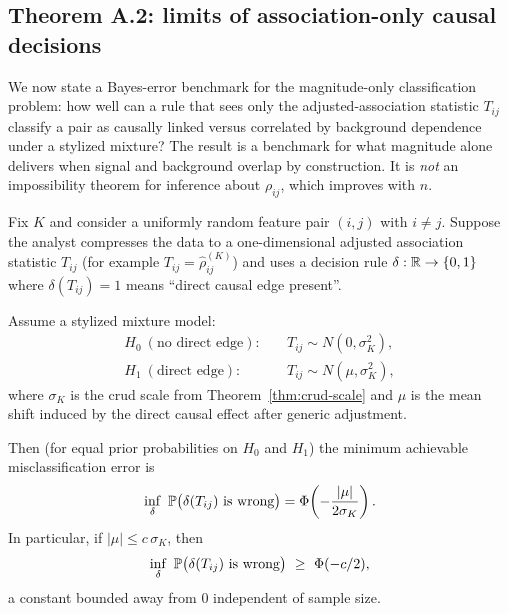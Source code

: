 \subsection{Theorem A.2: limits of association-only causal decisions}

We now state a Bayes-error benchmark for the magnitude-only classification problem: how well can a rule that sees only the adjusted-association statistic $T_{ij}$ classify a pair as causally linked versus correlated by background dependence under a stylized mixture? The result is a benchmark for what magnitude alone delivers when signal and background overlap by construction. It is \emph{not} an impossibility theorem for inference about $\rho_{ij}$, which improves with $n$.

\begin{theorem}\label{thm:assoc-only}
Fix $K$ and consider a uniformly random feature pair $(i,j)$ with $i\neq j$.
Suppose the analyst compresses the data to a one-dimensional adjusted association statistic
$T_{ij}$ (for example $T_{ij}=\hat\rho^{(K)}_{ij}$) and uses a decision rule
$\delta:\mathbb{R}\to\{0,1\}$ where $\delta(T_{ij})=1$ means ``direct causal edge present''.

Assume a stylized mixture model:
\begin{align}
H_0\ (\text{no direct edge}):\quad & T_{ij} \sim N(0,\sigma_K^2),\\
H_1\ (\text{direct edge}):\quad & T_{ij} \sim N(\mu,\sigma_K^2),
\end{align}
where $\sigma_K$ is the crud scale from Theorem~\ref{thm:crud-scale} and $\mu$ is the mean shift induced
by the direct causal effect after generic adjustment.

Then (for equal prior probabilities on $H_0$ and $H_1$) the minimum achievable misclassification error is
\begin{equation}
\inf_{\delta}\ \mathbb{P}\bigl(\delta(T_{ij})\ \text{is wrong}\bigr)
= \Phi\!\left(-\frac{|\mu|}{2\sigma_K}\right).
\end{equation}
In particular, if $|\mu|\le c\,\sigma_K$, then
\begin{equation}
\inf_{\delta}\ \PP\bigl(\delta(T_{ij})\ \text{is wrong}\bigr)\ \ge\ \Ph(-c/2),
\end{equation}
a constant bounded away from $0$ independent of sample size.
\end{theorem}


